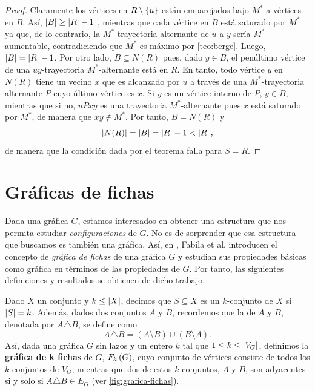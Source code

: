 \begin{proof}
  Claramente los v\'ertices en $R\setminus\left\{ u\right\}$ est\'an emparejados bajo $M^*$
  a v\'ertices en $B$. As\'i, $\left|B\right| \ge \left|R\right| - 1$ , mientras que cada
  v\'ertice en $B$ est\'a saturado por $M^*$ ya que, de lo contrario, la $M^*$
  trayectoria alternante de $u$ a $y$ ser\'ia $M^*$-aumentable, contradiciendo
  que $M^*$ es m\'aximo por \cref{teo:berge}. Luego, $\left|B\right| = \left|R\right| - 1$.
  Por otro lado, $B\subseteq N(R)$ pues, dado $y\in B$, el pen\'ultimo v\'ertice
  de una $uy$-trayectoria $M^*$-alternante est\'a en $R$. En tanto, todo
  v\'ertice $y$ en $N(R)$ tiene un vecino $x$ que es alcanzado por $u$ a
  trav\'es de una $M^*$-trayectoria alternante $P$ cuyo \'ultimo v\'ertice es
  $x$. Si $y$ es un v\'ertice interno de $P$, $y\in B$, mientras que si no,
  $uPxy$ es una trayectoria $M^*$-alternante pues $x$ est\'a saturado por $M^*$,
  de manera que $xy\notin M^*$. Por tanto, $B=N(R)$ y
  \[
    \left|N(R)\right| = \left|B\right| = \left|R\right| - 1 < \left|R\right|,
  \]
  de manera que la condici\'on dada por el teorema falla para $S=R$.

\end{proof}

\section{Gr\'aficas de fichas}

Dada una gr\'afica $G$, estamos interesados en obtener una estructura que nos
permita estudiar \textit{configuraciones} de $G$. No es de sorprender que esa
estructura que buscamos es tambi\'en una gr\'afica. As\'i, en \cite{fabila},
Fabila et al. introducen el concepto de \textit{gr\'afica de fichas} de una
gr\'afica $G$ y estudian sus propiedades b\'asicas como gr\'afica en t\'erminos
de las propiedades de $G$. Por tanto, las siguientes definiciones y resultados
se obtienen de dicho trabajo.

Dado $X$ un conjunto y $k\leq \left|X\right|$, decimos que $S\subseteq X$ es un
$k$-conjunto de $X$ si $\left|S\right|=k$. Adem\'as, dados dos conjuntos $A$ y $B$,
recordemos que la  de $A$ y $B$, denotada por
$A\triangle B$, se define como
\[
  A \triangle B = (A\setminus B) \cup (B\setminus A).
\]
As\'i, dada una gr\'afica $G$ sin lazos y un entero $k$ tal que $1\leq k\leq
\left|V_G\right|$, definimos la \textbf{gr\'afica de k fichas} de $G$, $F_{k}\left( G\right)$, cuyo conjunto de v\'ertices consiste de todos los
$k$-conjuntos de $V_G$, mientras que dos de estos $k$-conjuntos, $A$ y $B$, son
adyacentes si y solo si $A\triangle B\in E_G$ (ver \cref{fig:grafica-fichas}).

